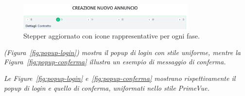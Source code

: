\begin{figure}[H]
\centering
\includegraphics[width=0.8\textwidth]{Immagini/Expert Reviews/Sito/StepperCreazioneAnnuncio.png}
\caption{Stepper aggiornato con icone rappresentative per ogni fase.}
\label{fig:stepper-dopo}
\end{figure}


\vspace{4pt}
\textit{(Figura~\ref{fig:popup-login}) mostra il popup di login con stile uniforme, mentre la Figura~\ref{fig:popup-conferma} illustra un esempio di messaggio di conferma.}

\vspace{4pt}
\textit{Le Figure~\ref{fig:popup-login} e~\ref{fig:popup-conferma} mostrano rispettivamente il popup di login e quello di conferma, uniformati nello stile PrimeVue.}

